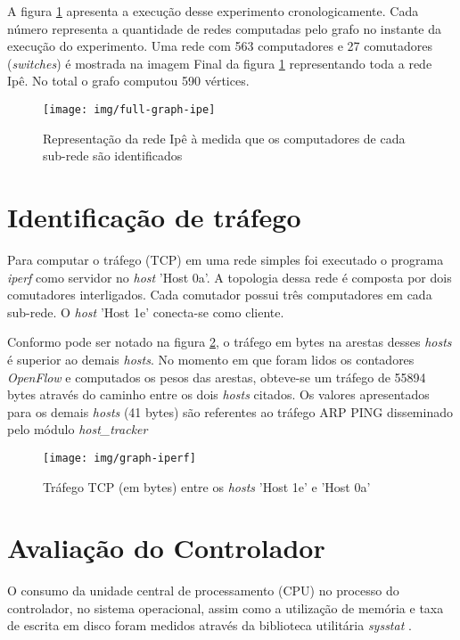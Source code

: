 A figura \ref{fig:full-graph-ipe} apresenta a execução desse experimento 
cronologicamente.
Cada número representa a quantidade de redes computadas pelo grafo no instante
da execução do experimento. 
Uma rede com 563 computadores e 27 comutadores (\emph{switches}) é mostrada
na imagem Final da figura \ref{fig:full-graph-ipe} representando toda a rede
Ipê.
No total o grafo computou 590 vértices.

\begin{figure}[htb!]
    \centering
    \label{fig:full-graph-ipe}
    \texttt{[image: img/full-graph-ipe]}
    \caption{Representação da rede Ipê à medida que os computadores de cada
    sub-rede são identificados}
\end{figure}


\section{Identificação de tráfego}

Para computar o tráfego (TCP) em uma rede simples foi executado o programa 
\emph{iperf} como servidor no \emph{host} 'Host 0a'.
A topologia dessa rede é composta por dois comutadores interligados.
Cada comutador possui três computadores em cada sub-rede.
O \emph{host} 'Host 1e' conecta-se como cliente. 

Conformo pode ser notado na figura \ref{fig:iperf}, o tráfego 
em bytes na arestas desses \emph{hosts} é superior ao demais \emph{hosts}.
No momento em que foram lidos os contadores \emph{OpenFlow} e computados
os pesos das arestas, obteve-se um tráfego de 55894 bytes através do caminho
entre os dois \emph{hosts} citados.
Os valores apresentados para os demais \emph{hosts} (41 bytes) são referentes
ao tráfego ARP PING disseminado pelo módulo \emph{host\_tracker}

\begin{figure}[h!]
    \centering
    \texttt{[image: img/graph-iperf]}
    \caption{Tráfego TCP (em bytes) entre os \emph{hosts} ’Host 1e’ e 
    ’Host 0a’}
    \label{fig:iperf}
\end{figure}

\section{Avaliação do Controlador}

O consumo da unidade central de processamento (CPU) no processo do controlador,
no sistema operacional, assim como a utilização de memória e taxa de escrita 
em disco foram medidos através da biblioteca utilitária \emph{sysstat} 
\citep{sebastien2015sysstat}.

